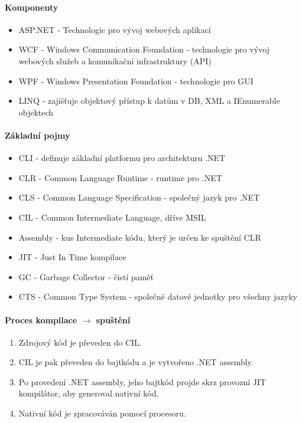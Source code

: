 \documentclass[10pt,a4paper]{article}
\begin{document}
\paragraph{Komponenty}
\begin{itemize}
\item ASP.NET - Technologie pro vývoj webových aplikací
\item WCF - Windows Communication Foundation - technologie pro vývoj webových služeb a komunikační infrastruktury (API)
\item WPF - Windows Presentation Foundation - technologie pro GUI
\item LINQ - zajišťuje objektový přístup k datům v DB, XML a IEnumerable objektech
\end{itemize}

\paragraph{Základní pojmy}
\begin{itemize}
\item CLI - definuje základní platformu pro architekturu .NET
\item CLR - Common Language Runtime - runtime pro .NET
\item CLS - Common Language Specification - společný jazyk pro .NET
\item CIL - Common Intermediate Language, dříve MSIL
\item Assembly - kus Intermediate kódu, který je určen ke spuštění CLR
\item JIT - Just In Time kompilace
\item GC - Garbage Collector - čistí paměť
\item CTS - Common Type System - společné datové jednotky pro všechny jazyky
\end{itemize}

\paragraph{Proces kompilace $\rightarrow$ spuštění}
\begin{enumerate}
\item Zdrojový kód je převeden do CIL.
\item CIL je pak převeden do bajtkódu a je vytvořeno .NET assembly.
\item Po provedení .NET assembly, jeho bajtkód projde skrz provozní JIT kompilátor, aby generoval nativní kód.
\item Nativní kód je zpracováván pomocí procesoru.
\end{enumerate}
\end{document}
